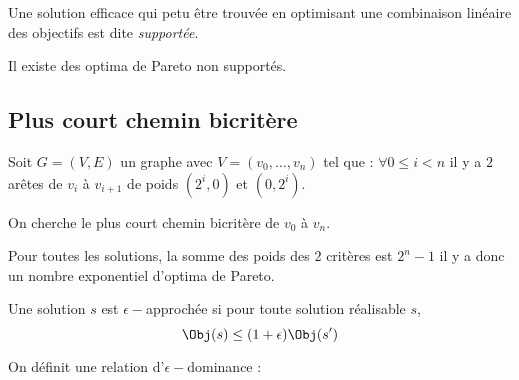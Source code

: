 \documentclass[a4paper,11pt]{article}
\begin{document}
\begin{df}
    Une solution efficace qui petu être trouvée en optimisant une combinaison linéaire des objectifs
    est dite \emph{supportée}.
\end{df}

\begin{rq}
    Il existe des optima de Pareto non supportés.
\end{rq}

\subsection{Plus court chemin bicritère}

Soit $G=(V, E)$ un graphe avec $V = (v_0, \dots, v_n)$ tel que : $\forall 0 \leq i < n$ il y a $2$
arêtes de $v_i$ à $v_{i+1}$ de poids $(2^i, 0)$ et $(0, 2^i)$.


On cherche le plus court chemin bicritère de $v_0$ à $v_n$.
\begin{figure}
    \begin{center}
    \end{center}
\end{figure}

Pour toutes les solutions, la somme des poids des $2$ critères est $2^n -1$ il y a donc un nombre
exponentiel d'optima de Pareto.

\begin{df}
    Une solution $s$ est $\epsilon-$approchée si pour toute solution réalisable $s$, 
    \begin{displaymath}
        \Obj(s) \leq (1 + \epsilon) \Obj(s')
    \end{displaymath}
\end{df}

\begin{df}
    On définit une relation d'$\epsilon-$dominance :
    \begin{displaymath}
    \end{displaymath}
\end{df}
\end{document}
